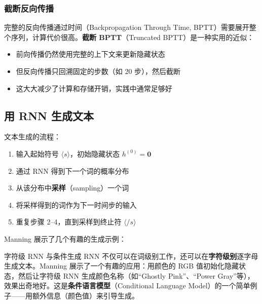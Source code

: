 \documentclass[a4paper]{article}
\begin{document}
\subsubsection{截断反向传播}

完整的反向传播通过时间（Backpropagation Through Time, BPTT）需要展开整个序列，计算代价很高。\textbf{截断 BPTT}（Truncated BPTT）是一种实用的近似：

\begin{itemize}
    \item 前向传播仍然使用完整的上下文来更新隐藏状态
    \item 但反向传播只回溯固定的步数（如 20 步），然后截断
    \item 这大大减少了计算和存储开销，实践中通常足够好
\end{itemize}

\subsection{用 RNN 生成文本}





文本生成的流程：

\begin{enumerate}
    \item 输入起始符号 $\langle s \rangle$，初始隐藏状态 $h^{(0)} = \mathbf{0}$
    \item 通过 RNN 得到下一个词的概率分布
    \item 从该分布中\textbf{采样}（sampling）一个词
    \item 将采样得到的词作为下一时间步的输入
    \item 重复步骤 2--4，直到采样到终止符 $\langle/s\rangle$
\end{enumerate}

Manning 展示了几个有趣的生成示例：









\begin{knowledgebox}{字符级 RNN 与条件生成}
RNN 不仅可以在词级别工作，还可以在\textbf{字符级别}逐字母生成文本。Manning 展示了一个有趣的应用：用颜色的 RGB 值初始化隐藏状态，然后让字符级 RNN 生成颜色名称（如``Ghostly Pink''、``Power Gray''等），效果出奇地好。这是\textbf{条件语言模型}（Conditional Language Model）的一个简单例子——用额外信息（颜色值）来引导生成。
\end{knowledgebox}
\end{document}

